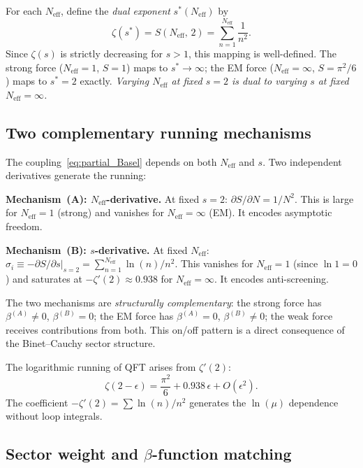 For each $N_\text{eff}$, define the \emph{dual exponent} $s^*(N_\text{eff})$ by
\begin{equation}
\zeta(s^*) = S(N_\text{eff},\, 2) = \sum_{n=1}^{N_\text{eff}} \frac{1}{n^2}.
\end{equation}
Since $\zeta(s)$ is strictly decreasing for $s > 1$, this mapping is well-defined.  The strong force ($N_\text{eff} = 1$, $S = 1$) maps to $s^* \to \infty$; the EM force ($N_\text{eff} = \infty$, $S = \pi^2/6$) maps to $s^* = 2$ exactly.  \emph{Varying $N_\text{eff}$ at fixed $s = 2$ is dual to varying $s$ at fixed $N_\text{eff} = \infty$.}

\subsection{Two complementary running mechanisms}
\label{sec:dual_mechanisms}

The coupling~\eqref{eq:partial_Basel} depends on both $N_\text{eff}$ and $s$.  Two independent derivatives generate the running:

\medskip\noindent\textbf{Mechanism~(A): $N_\text{eff}$-derivative.}
At fixed $s = 2$: $\partial S / \partial N = 1/N^2$.  This is large for $N_\text{eff} = 1$ (strong) and vanishes for $N_\text{eff} = \infty$ (EM).  It encodes asymptotic freedom.

\medskip\noindent\textbf{Mechanism~(B): $s$-derivative.}
At fixed $N_\text{eff}$: $\sigma_i \equiv -\partial S/\partial s |_{s=2} = \sum_{n=1}^{N_\text{eff}} \ln(n)/n^2$.  This vanishes for $N_\text{eff} = 1$ (since $\ln 1 = 0$) and saturates at $-\zeta'(2) \approx 0.938$ for $N_\text{eff} = \infty$.  It encodes anti-screening.

\medskip
The two mechanisms are \emph{structurally complementary}: the strong force has $\beta^{(A)} \neq 0$, $\beta^{(B)} = 0$; the EM force has $\beta^{(A)} = 0$, $\beta^{(B)} \neq 0$; the weak force receives contributions from both.  This on/off pattern is a direct consequence of the Binet--Cauchy sector structure.

The logarithmic running of QFT arises from $\zeta'(2)$:
\begin{equation}
\zeta(2 - \epsilon) = \frac{\pi^2}{6} + 0.938\,\epsilon + O(\epsilon^2).
\end{equation}
The coefficient $-\zeta'(2) = \sum \ln(n)/n^2$ generates the $\ln(\mu)$ dependence without loop integrals.

\subsection{Sector weight and $\beta$-function matching}
\label{sec:sector_weight}

